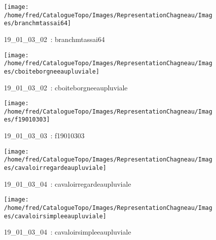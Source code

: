 \documentclass[12pt,titlepage]{book}
\begin{document}
\begin{figure}[h!]
\begin{minipage}[t]{3cm}
\begin{center}
    \end{center}
  \end{minipage}
  \begin{minipage}[t]{3cm}
    \begin{center}
      \texttt{[image: /home/fred/CatalogueTopo/Images/RepresentationChagneau/Images/branchmtassai64]}
      \caption[~19\_01\_03\_02]{\small{19\_01\_03\_02~:} \tiny{branchmtassai64}}\label{branchmtassai64}
    \end{center}
  \end{minipage}
  \begin{minipage}[t]{3cm}
    \begin{center}
      \texttt{[image: /home/fred/CatalogueTopo/Images/RepresentationChagneau/Images/cboiteborgneeaupluviale]}
      \caption[~19\_01\_03\_02]{\small{19\_01\_03\_02~:} \tiny{cboiteborgneeaupluviale}}\label{cboiteborgneeaupluviale}
    \end{center}
  \end{minipage}
  \begin{minipage}[t]{3cm}
    \begin{center}
      \texttt{[image: /home/fred/CatalogueTopo/Images/RepresentationChagneau/Images/f19010303]}
      \caption[~19\_01\_03\_03]{\small{19\_01\_03\_03~:} \tiny{f19010303}}\label{f19010303}
    \end{center}
  \end{minipage}
  \begin{minipage}[t]{3cm}
    \begin{center}
      \texttt{[image: /home/fred/CatalogueTopo/Images/RepresentationChagneau/Images/cavaloirregardeaupluviale]}
      \caption[~19\_01\_03\_04]{\small{19\_01\_03\_04~:} \tiny{cavaloirregardeaupluviale}}\label{cavaloirregardeaupluviale}
    \end{center}
  \end{minipage}
  \begin{minipage}[t]{3cm}
    \begin{center}
      \texttt{[image: /home/fred/CatalogueTopo/Images/RepresentationChagneau/Images/cavaloirsimpleeaupluviale]}
      \caption[~19\_01\_03\_04]{\small{19\_01\_03\_04~:} \tiny{cavaloirsimpleeaupluviale}}\label{cavaloirsimpleeaupluviale}
    \end{center}

\end{minipage}
\end{figure}
\end{document}
